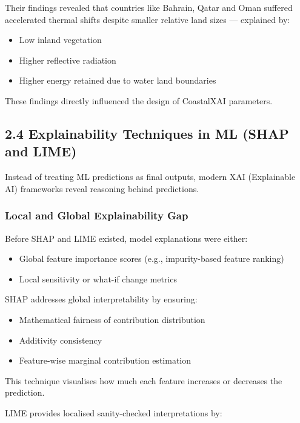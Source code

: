 \documentclass[12pt, a4paper]{article}
\begin{document}
Their findings revealed that countries like Bahrain, Qatar and Oman suffered accelerated thermal shifts despite smaller relative land sizes — explained by:

\begin{itemize}
    \item Low inland vegetation
    \item Higher reflective radiation
    \item Higher energy retained due to water land boundaries
\end{itemize}

These findings directly influenced the design of CoastalXAI parameters.

\subsection{\textbf{2.4 Explainability Techniques in ML (SHAP and LIME)}} 

Instead of treating ML predictions as final outputs, modern XAI (Explainable AI) frameworks reveal reasoning behind predictions.

\subsubsection{\textbf{Local and Global Explainability Gap}}

Before SHAP and LIME existed, model explanations were either:

\begin{itemize}
    \item Global feature importance scores (e.g., impurity-based feature ranking)
    \item Local sensitivity or what-if change metrics
\end{itemize}

SHAP \cite{shap2017} addresses global interpretability by ensuring:

\begin{itemize}
    \item Mathematical fairness of contribution distribution  
    \item Additivity consistency  
    \item Feature-wise marginal contribution estimation  
\end{itemize}

This technique visualises how much each feature increases or decreases the prediction.

LIME \cite{lime2016} provides localised sanity-checked interpretations by:
\end{document}
